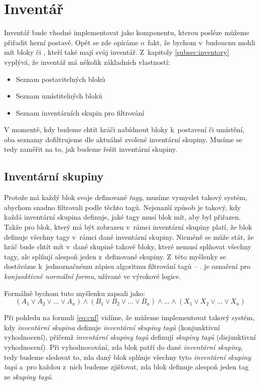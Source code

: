 
\section{Inventář}

Inventář bude vhodné implementovat jako komponentu, kterou posléze můžeme přiřadit herní postavě. Opět se zde opíráme o~fakt, že bychom v~budoucnu mohli mít bloky či \NPC{}, kteří také mají svůj inventář. Z~kapitoly \ref{subsec:inventory} vyplývá, že inventář má několik základních vlastností:

\begin{itemize}
	\item Seznam postavitelných bloků
	\item Seznam umístitelných bloků
	\item Seznam inventárních skupin pro filtrování
\end{itemize}

V momentě, kdy budeme chtít hráči nabídnout bloky k~postavení či umístění, oba seznamy dofiltrujeme dle aktuálně zvolené inventární skupiny. Musíme se tedy zaměřit na to, jak budeme řešit inventární skupiny.

\subsection{Inventární skupiny}

Protože má každý blok svoje definované \textit{tagy}, musíme vymyslet takový systém, abychom snadno filtrovali podle těchto tagů. Nejsnazší způsob je takový, kdy každá inventární skupina definuje, jaké tagy musí blok mít, aby byl přiřazen. Takže pro blok, který má být zobrazen v~rámci inventární skupiny platí, že blok definuje všechny tagy v~rámci dané inventární skupiny. Nicméně se může stát, že hráč bude chtít mít v~dané skupině takové bloky, které nemusí splňovat všechny tagy, ale splňují alespoň jeden z~definované skupiny. Z~této myšlenky se dostáváme k~jednoznačnému zápisu algoritmu filtrování tagů -- \CNF{}. \CNF{} je označení pro \textit{konjunktivně normální formu}, užívané ve výrokové logice.

Formálně bychom tuto myšlenku zapsali jako:
\begin{equation}\label{eq:cnf}
	( A_1 \lor A_2 \lor ... \lor A_n )  \land ( B_1 \lor B_2 \lor ... \lor B_n ) \land ... \land ( X_1 \lor X_2 \lor ... \lor X_n )  
\end{equation}


Při pohledu na formuli \ref{eq:cnf} vidíme, že můžeme implementovat takový systém, kdy \textit{inventární skupina} definuje \textit{inventární skupiny tagů} (konjunktivní vyhodnocení), přičemž \textit{inventární skupiny tagů} definují \textit{skupiny tagů} (disjunktivní vyhodnocení). Při vyhodnocování, zda blok patří do dané \textit{inventární skupiny}, tedy budeme sledovat to, zda daný blok splňuje všechny tyto \textit{inventární skupiny tagů} a~pro každou z~nich budeme zjišťovat, zda blok definuje alespoň jeden tag ze \textit{skupiny tagů}. 

